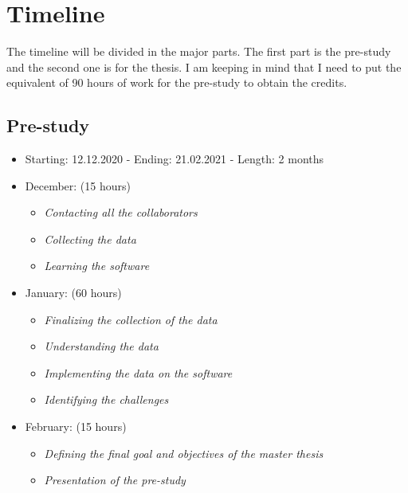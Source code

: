\documentclass[helv,dvipsnames]{apa7}
\begin{document}
\section{Timeline}
The timeline will be divided in the major parts. The first part is the pre-study and the second one is for the thesis. I am keeping in mind that I need to put the equivalent of 90 hours of work for the pre-study to obtain the credits.

\subsection{Pre-study}
\begin{itemize}
    \item Starting: 12.12.2020 -  Ending:   21.02.2021 - Length: 2 months
    \item December: (15 hours)
    \vspace{-0.25cm}
    \begin{itemize}
        \itemsep0mm
        \item \textit{Contacting all the collaborators}
        \item \textit{Collecting the data}
        \item \textit{Learning the software}
    \end{itemize}
    \item January: (60 hours)
        \vspace{-0.25cm}
    \begin{itemize}
        \itemsep0mm
        \item \textit{Finalizing the collection of the data}
        \item \textit{Understanding the data}
        \item \textit{Implementing the data on the software}
        \item \textit{Identifying the challenges}
    \end{itemize}
    \item February: (15 hours)
        \vspace{-0.25cm}
    \begin{itemize}
        \itemsep0mm
        \item \textit{Defining the final goal and objectives of the master thesis}
        \item \textit{Presentation of the pre-study}
    \end{itemize}
\end{itemize}
\end{document}
